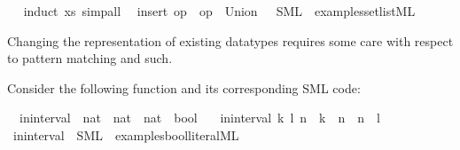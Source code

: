 \begin{isabellebody}
\isadelimproof
\ %
\endisadelimproof
%
\isatagproof
{}\isamarkupfalse%
\ {\isacharparenleft}induct\ xs{\isacharparenright}\ simp{\isacharunderscore}all%
\endisatagproof
{\isafoldproof}%
%
\isadelimproof
%
\endisadelimproof
\isanewline
\isanewline
{}\isamarkupfalse%
\ {\isachardoublequoteopen}{\isacharbraceleft}{\isacharbraceright}{\isachardoublequoteclose}\ insert\ {\isachardoublequoteopen}op\ {\isasymin}{\isachardoublequoteclose}\ {\isachardoublequoteopen}op\ {\isasymunion}{\isachardoublequoteclose}\ {\isachardoublequoteopen}Union{\isachardoublequoteclose}\ \ \ SML\ \ {\isachardoublequoteopen}examples{\isacharslash}set{\isacharunderscore}list{\isachardot}ML{\isachardoublequoteclose}%
\begin{isamarkuptext}%

  \medskip

  Changing the representation of existing datatypes requires
  some care with respect to pattern matching and such.%
\end{isamarkuptext}%
\isamarkuptrue%
%
\isamarkuptrue%
%
\isamarkuptrue%
%
\begin{isamarkuptext}%
Consider the following function and its corresponding
  SML code:%
\end{isamarkuptext}%
\isamarkuptrue%
\isamarkupfalse%
\isanewline
\ \ in{\isacharunderscore}interval\ {\isacharcolon}{\isacharcolon}\ {\isachardoublequoteopen}nat\ {\isasymtimes}\ nat\ {\isasymRightarrow}\ nat\ {\isasymRightarrow}\ bool{\isachardoublequoteclose}\ \isanewline
\ \ {\isachardoublequoteopen}in{\isacharunderscore}interval\ {\isacharparenleft}k{\isacharcomma}\ l{\isacharparenright}\ n\ {\isasymlongleftrightarrow}\ k\ {\isasymle}\ n\ {\isasymand}\ n\ {\isasymle}\ l{\isachardoublequoteclose}%
\isadelimtt
%
\endisadelimtt
%
\isatagtt
%
\endisatagtt
{\isafoldtt}%
%
\isadelimtt
%
\endisadelimtt
{}\isamarkupfalse%
\ in{\isacharunderscore}interval\ \ SML\ \ {\isachardoublequoteopen}examples{\isacharslash}bool{\isacharunderscore}literal{\isachardot}ML{\isachardoublequoteclose}%
\begin{isamarkuptext}%


\end{isamarkuptext}
\end{isabellebody}
